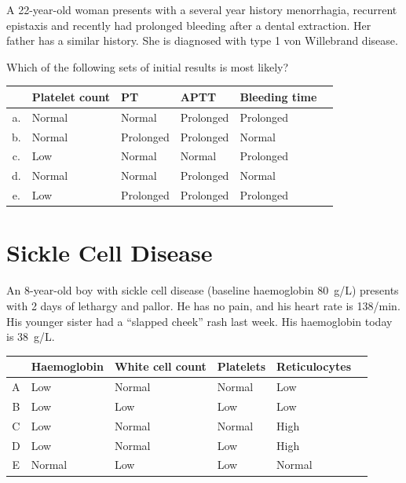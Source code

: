 \documentclass{article}
\begin{document}
A 22-year-old woman presents with a several year history menorrhagia, recurrent epistaxis and recently had prolonged bleeding after a dental extraction. Her father has a similar history. She is diagnosed with type 1 von Willebrand disease.

Which of the following sets of initial results is most likely?

\begin{center}
	\begin{tabular}{@{}clllll@{}}
		\toprule
		& \textbf{Platelet count} & \textbf{PT} & \textbf{APTT} & \textbf{Bleeding time} \\
		\midrule
		a. & Normal & Normal     & Prolonged & Prolonged \\
		b. & Normal & Prolonged  & Prolonged & Normal    \\
		c. & Low    & Normal     & Normal    & Prolonged \\
		d. & Normal & Normal     & Prolonged & Normal    \\
		e. & Low    & Prolonged  & Prolonged & Prolonged \\
		\bottomrule
	\end{tabular}
\end{center}

\section{Sickle Cell Disease}

An 8-year-old boy with sickle cell disease (baseline haemoglobin 80~g/L) presents with 2 days of lethargy and pallor. He has no pain, and his heart rate is 138/min. His younger sister had a ``slapped cheek'' rash last week. His haemoglobin today is 38~g/L.

\begin{tabular}{@{}clllll@{}}
	\toprule
	& \textbf{Haemoglobin} & \textbf{White cell count} & \textbf{Platelets} & \textbf{Reticulocytes} \\
	\midrule
	A & Low    & Normal & Normal & Low  \\
	B & Low    & Low    & Low    & Low  \\
	C & Low    & Normal & Normal & High \\
	D & Low    & Normal & Low    & High \\
	E & Normal & Low    & Low    & Normal \\
	\bottomrule
\end{tabular}
\end{document}
